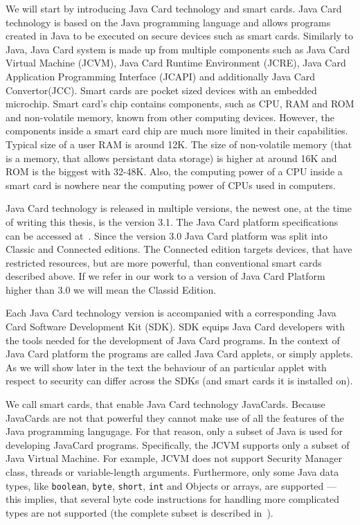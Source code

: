 We will start by introducing Java Card technology and smart cards. Java Card technology is based on the Java programming language and allows programs created in Java to be executed on secure devices such as smart cards. Similarly to Java, Java Card system is made up from multiple components such as Java Card Virtual Machine (JCVM), Java Card Runtime Environment (JCRE), Java Card Application Programming Interface (JCAPI) and additionally Java Card Convertor(JCC).  Smart cards are pocket sized devices with an embedded microchip. Smart card's chip contains components, such as CPU, RAM and ROM and non-volatile memory, known from other computing devices. However, the components inside a smart card chip are much more limited in their capabilities. Typical size of a user RAM is around 12K. The size of non-volatile memory (that is a memory, that allows persistant data storage) is higher at around 16K and ROM is the biggest with 32-48K. Also, the computing power of a CPU inside a smart card is nowhere near the computing power of CPUs used in computers.

Java Card technology is released in multiple versions, the newest one, at the time of writing this thesis, is the version 3.1. The Java Card platform specifications can be accessed at~\cite{jcspecs31download}. Since the version 3.0 Java Card platform was split into Classic and Connected editions. The Connected edition targets devices, that have restricted resources, but are more powerful, than conventional smart cards described above. If we refer in our work to a version of Java Card Platform higher than 3.0 we will mean the Classid Edition.


Each Java Card technology version is accompanied with a corresponding Java Card Software Development Kit (SDK). SDK equips Java Card developers with the tools needed for the development of Java Card programs. In the context of Java Card platform the programs are called Java Card applets, or simply applets. As we will show later in the text the behaviour of an particular applet with respect to security can differ across the SDKs (and smart cards it is installed on).


We call smart cards, that enable Java Card technology JavaCards. Because JavaCards are not that powerful they cannot make use of all the features of the Java programming langugage. For that reason, only a subset of Java is used for developing JavaCard programs. Specifically, the JCVM supports only a subset of Java Virtual Machine. For example, JCVM does not support Security Manager class, threads or variable-length arguments. Furthermore, only some Java data types, like \texttt{boolean}, \texttt{byte}, \texttt{short}, \texttt{int} and Objects or arrays, are supported --- this implies, that several byte code instructions for handling more complicated types are not supported (the complete subset is described in~\cite{jcspecs31download}).


